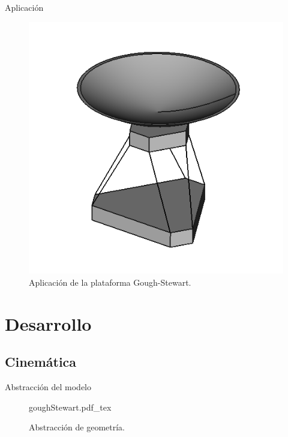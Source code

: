 \documentclass{beamer}
\begin{document}
{
\usebackgroundtemplate%
{%
}

\begin{frame}{Aplicación}
 \begin{figure}[h]
 \centering
 \includegraphics[scale=0.4]{../img/implementation.png}
 \caption{Aplicación de la plataforma Gough-Stewart.}
 \label{fig: antenna}
\end{figure}

\end{frame}
}

\section{Desarrollo}

\subsection{Cinemática}

{
\usebackgroundtemplate%
{%
}
\begin{frame}{Abstracción del modelo}{}
 \begin{center}
 \begin{figure}
 {goughStewart.pdf_tex} 
 \caption{Abstracción de geometría.}
 \label{key: diagram}
 \end{figure}

 
 \end{center}

\end{frame}}
\end{document}
